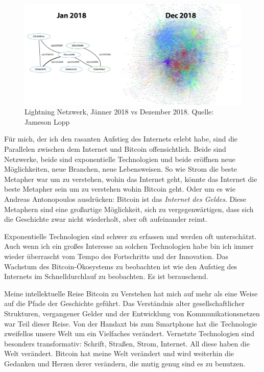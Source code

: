\begin{figure}
  \includegraphics{assets/images/lnd-growth-lopp-white.png}
  \caption{Lightning Netzwerk, Jänner 2018 vs Dezember 2018. Quelle: Jameson Lopp}
  \label{fig:lnd-growth-lopp-white.png}
\end{figure}

Für mich, der ich den rasanten Aufstieg des Internets erlebt habe, sind die
Parallelen zwischen dem Internet und Bitcoin offensichtlich. Beide sind
Netzwerke, beide sind exponentielle Technologien und beide eröffnen neue
Möglichkeiten, neue Branchen, neue Lebensweisen. So wie Strom die beste Metapher
war um zu verstehen, wohin das Internet geht, könnte das Internet die beste
Metapher sein um zu verstehen wohin Bitcoin geht. Oder um es wie Andreas
Antonopoulos ausdrücken: Bitcoin ist das \textit{Internet des Geldes}. Diese
Metaphern sind eine großartige Möglichkeit, sich zu vergegenwärtigen, dass sich
die Geschichte zwar nicht wiederholt, aber oft aufeinander reimt.

Exponentielle Technologien sind schwer zu erfassen und werden oft unterschätzt.
Auch wenn ich ein großes Interesse an solchen Technologien habe bin ich immer
wieder überrascht vom Tempo des Fortschritts und der Innovation. Das Wachstum
des Bitcoin-Ökosystems zu beobachten ist wie den Aufstieg des Internets im
Schnelldurchlauf zu beobachten. Es ist berauschend.

Meine intellektuelle Reise Bitcoin zu Verstehen hat mich auf mehr als eine Weise
auf die Pfade der Geschichte geführt. Das Verständnis alter gesellschaftlicher
Strukturen, vergangener Gelder und der Entwicklung von Kommunikationsnetzen war
Teil dieser Reise. Von der Handaxt bis zum Smartphone hat die Technologie
zweifellos unsere Welt um ein Vielfaches verändert. Vernetzte Technologien sind
besonders transformativ: Schrift, Straßen, Strom, Internet. All diese haben
die Welt verändert. Bitcoin hat meine Welt verändert und wird weiterhin die
Gedanken und Herzen derer verändern, die mutig genug sind es zu benutzen.

